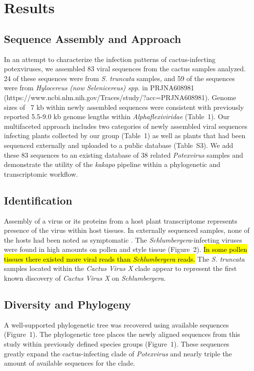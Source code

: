 \documentclass[fleqn,10pt,lineno]{wlpeerj}
\begin{document}
\section*{Results}
\subsection*{Sequence Assembly and Approach}
In an attempt to characterize the infection patterns of cactus-infecting potexviruses, we assembled 83 viral sequences from the cactus samples analyzed. 
24 of these sequences were from \textit{S. truncata} samples, and 59 of the sequences were from \textit{Hylocereus (now Selenicereus) spp.} in PRJNA608981 (https://www.ncbi.nlm.nih.gov/Traces/study/?acc=PRJNA608981)\citep{fan2020retracted}.
Genome sizes of ~7 kb within newly assembled sequences were consistent with previously reported 5.5-9.0 kb genome lengths within \textit{Alphaflexiviridae} \citep{kreuze_ictv_2020,ICTV_potexviruses}(Table~1).
Our multifaceted approach includes two categories of newly assembled viral sequences infecting plants collected by our group (Table~1) as well as plants that had been sequenced externally and uploaded to a public database (Table~S3).
We add these 83 sequences to an existing database of 38 related \textit{Potexvirus} samples and demonstrate the utility of the \textit{kakapo} pipeline within a phylogenetic and transcriptomic workflow. 

 

\subsection*{Identification}
Assembly of a virus or its proteins from a host plant transcriptome represents presence of the virus within host tissues. 
In externally sequenced samples, none of the hosts had been noted as symptomatic \citep{fan2020retracted}.
The \textit{Schlumbergera}-infecting viruses were found in high amounts on pollen and style tissue (Figure~2).
\hl{In some pollen tissues there existed more viral reads than \textit{Schlumbergera} reads.}
The \textit{S. truncata} samples located within the \textit{Cactus Virus X} clade appear to represent the first known discovery of \textit{Cactus Virus X} on \textit{Schlumbergera}.


\subsection*{Diversity and Phylogeny}
A well-supported phylogenetic tree was recovered using available sequences (Figure~1).
The phylogenetic tree places the newly aligned sequences from this study within previously defined species groups (Figure~1).
These sequences greatly expand the cactus-infecting clade of \textit{Potexvirus} and nearly triple the amount of available sequences for the clade. 
\end{document}
